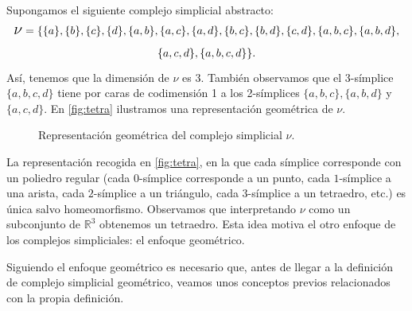 \documentclass[12pt, a4paper, twoside]{book}
\numberwithin{equation}{section}
\theoremstyle{definition}
\newenvironment{ejem}
  {\pushQED{\qed}\renewcommand{\qedsymbol}{$\blacktriangleleft$}\ejemplo}
  {\popQED\endejemplo}
\theoremstyle{remark}
\theoremstyle{plain}
\begin{document}
	\begin{ejem}
		\label{ejem:1}
		Supongamos el siguiente complejo simplicial abstracto:
		\begin{multline*} 
			\text{{\Large $\nu$}}=\{\{a\},\{b\},\{c\},\{d\},
			\{a,b\},\{a,c\},\{a,d\},\{b,c\},\{b,d\},\{c,d\},
			\{a,b,c\},\{a,b,d\},\\
			\{a,c,d\},\{a,b,c,d\}\}.
		\end{multline*}
		Así, tenemos que la dimensión de {\Large $\nu$} es 3. También 
		observamos que el 3-símplice $\{a,b,c,d\}$ tiene por caras de 
		codimensión 1 a los 2-símplices $\{a,b,c\},\{a,b,d\}$ y 
		$\{a,c,d\}$. En \autoref{fig:tetra} ilustramos una 
		representación geométrica de {\Large $\nu$}.

		\begin{figure}[!htbp]
			\centering
			\caption{Representación geométrica del complejo simplicial {\Large $\nu$}.}
			\label{fig:tetra}
		\end{figure}

		La representación recogida en \autoref{fig:tetra}, en la
		que cada símplice corresponde con un poliedro regular (cada 
		$0$-símplice corresponde a un punto, cada $1$-símplice a una 
		arista, cada $2$-símplice a un triángulo, cada $3$-símplice a 
		un tetraedro, etc.) es única salvo homeomorfismo. Observamos 
		que interpretando {\Large $\nu$} como un subconjunto de 
		$\mathbb{R}^{3}$ obtenemos un tetraedro. Esta idea motiva el 
		otro enfoque de los complejos simpliciales: el enfoque 
		geométrico.
	\end{ejem}

	Siguiendo el enfoque geométrico es necesario que, antes de llegar a la
	definición de complejo simplicial geométrico, veamos unos conceptos 
	previos relacionados con la propia definición.
\end{document}
